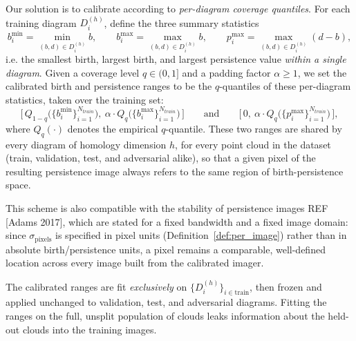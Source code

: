 \documentclass[11pt,letterpaper]{article}
\newcommand{\1}{\mathds{1}}
\theoremstyle{plain}
\theoremstyle{definitioncolon}
\begin{document}
Our solution is to calibrate according to \emph{per-diagram coverage quantiles}.
For each training diagram $D_i^{(h)}$, define the three summary statistics
\begin{equation}
    \label{eq:calib-stats}
    b_i^{\min} = \min_{(b,d) \in D_i^{(h)}} b, \qquad
    b_i^{\max} = \max_{(b,d) \in D_i^{(h)}} b, \qquad
    p_i^{\max} = \max_{(b,d) \in D_i^{(h)}} (d - b),
\end{equation}
i.e. the smallest birth, largest birth, and largest persistence value
\emph{within a single diagram}. Given a coverage level $q \in (0,1]$ and a
padding factor $\alpha \geq 1$, we set the calibrated birth and persistence
ranges to be the $q$-quantiles of these per-diagram statistics, taken over the
training set:
\begin{equation}
    \label{eq:calib-ranges}
    \big[\,Q_{1-q}\big(\{b_i^{\min}\}_{i=1}^{N_{train}}\big),\
    \alpha \cdot Q_{q}\big(\{b_i^{\max}\}_{i=1}^{N_{train}}\big)\,\big]
    \qquad \text{and} \qquad
    \big[\,0,\ \alpha \cdot
    Q_{q}\big(\{p_i^{\max}\}_{i=1}^{N_{train}}\big)\,\big],
\end{equation}
where $Q_q(\cdot)$ denotes the empirical $q$-quantile. These two
ranges are shared by every diagram of homology dimension $h$, for every point
cloud in the dataset (train, validation, test, and adversarial alike), so that a
given pixel of the resulting persistence image always refers to the same region
of birth-persistence space.

This scheme is also compatible with the stability of persistence
images REF [Adams 2017], which are stated for a fixed bandwidth and a
fixed image domain: since $\sigma_{\text{pixels}}$ is specified in pixel units
(Definition~\ref{def:per_image}) rather than in absolute birth/persistence units,
a pixel remains a comparable, well-defined location across every image built from
the calibrated imager.

The calibrated ranges are fit \emph{exclusively} on $\{D_i^{(h)}\}_{i \in \text{train}}$, 
then frozen and applied unchanged to validation, test, and adversarial diagrams.
Fitting the ranges on the full, unsplit population of clouds leaks information 
about the held-out clouds into the training images. 

\end{document}
